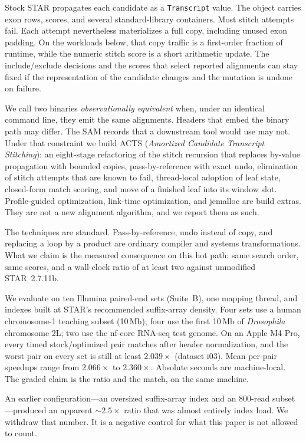 \documentclass[11pt]{article}
\newcommand{\STAR}{STAR\xspace}
\newcommand{\ACTS}{ACTS\xspace}
\newcommand{\Transcript}{\texttt{Transcript}\xspace}
\begin{document}
Stock \STAR propagates each candidate as a \Transcript value.
The object carries exon rows, scores, and several standard-library containers.
Most stitch attempts fail.
Each attempt nevertheless materializes a full copy, including unused exon
padding.
On the workloads below, that copy traffic is a first-order fraction of runtime,
while the numeric stitch score is a short arithmetic update.
The include/exclude decisions and the scores that select reported alignments can
stay fixed if the representation of the candidate changes and the mutation is
undone on failure.

We call two binaries \emph{observationally equivalent} when, under an identical
command line, they emit the same alignments.
Headers that embed the binary path may differ.
The SAM records that a downstream tool would use may not.
Under that constraint we build \ACTS
(\emph{Amortized Candidate Transcript Stitching}): an eight-stage refactoring of
the stitch recursion that replaces by-value propagation with bounded copies,
pass-by-reference with exact undo, elimination of stitch attempts that are known
to fail, thread-local adoption of leaf state, closed-form match scoring, and
move of a finished leaf into its window slot.
Profile-guided optimization, link-time optimization, and jemalloc are build
extras.
They are not a new alignment algorithm, and we report them as such.

The techniques are standard.
Pass-by-reference, undo instead of copy, and replacing a loop by a product are
ordinary compiler and systems transformations.
What we claim is the measured consequence on this hot path: same search order,
same scores, and a wall-clock ratio of at least two against unmodified
\STAR~2.7.11b.

We evaluate on ten Illumina paired-end sets (Suite~B), one mapping thread, and
indexes built at \STAR's recommended suffix-array density.
Four sets use a human chromosome-1 teaching subset (10\,Mb); four use the first
10\,Mb of \emph{Drosophila} chromosome 2L; two use the nf-core RNA-seq test
genome.
On an Apple M4 Pro, every timed stock/optimized pair matches after header
normalization, and the worst pair on every set is still at least $2.039\times$
(dataset i03).
Mean per-pair speedups range from $2.066\times$ to $2.360\times$.
Absolute seconds are machine-local.
The graded claim is the ratio and the match, on the same machine.

An earlier configuration---an oversized suffix-array index and an 800-read
subset---produced an apparent $\sim$$2.5\times$ ratio that was almost entirely
index load.
We withdraw that number.
It is a negative control for what this paper is not allowed to count.
\end{document}
